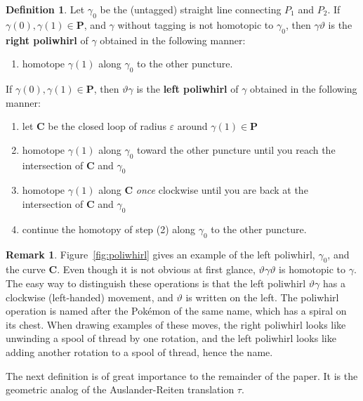 \documentclass[11pt]{amsart}
\theoremstyle{plain}
\theoremstyle{definition}
\newtheorem{definition}[theorem]{Definition}
\newtheorem{remark}[theorem]{Remark}
\numberwithin{equation}{section}
\def\PP{\mathbf{P}}
\begin{document}
\begin{definition}\label{def-poliwhirl}
    Let $\gamma_0$ be the (untagged) straight line connecting $P_1$ and $P_2$.
    If $\gamma(0),\gamma(1) \in \PP$, and $\gamma$ without tagging is not homotopic to $\gamma_0$, then $\gamma\vartheta$ is the \textbf{right poliwhirl} of $\gamma$ obtained in the following manner:
    \begin{enumerate}
        \item homotope $\gamma(1)$ along $\gamma_0$ to the other puncture.
    \end{enumerate}
    If $\gamma(0),\gamma(1) \in \PP$, then $\vartheta\gamma$ is the \textbf{left poliwhirl} of $\gamma$ obtained in the following manner:
    \begin{enumerate}
        \item let $\mathbf{C}$ be the closed loop of radius $\varepsilon$ around $\gamma(1) \in \PP$
        \item homotope $\gamma(1)$ along $\gamma_0$ toward the other puncture until you reach the intersection of $\mathbf{C}$ and $\gamma_0$
        \item homotope $\gamma(1)$ along $\mathbf{C}$ \textit{once} clockwise until you are back at the intersection of $\mathbf{C}$ and $\gamma_0$
        \item continue the homotopy of step (2) along $\gamma_0$ to the other puncture.
    \end{enumerate}
\end{definition}

\begin{remark}
    Figure~\ref{fig:poliwhirl} gives an example of the left poliwhirl, $\gamma_0$, and the curve $\mathbf{C}$.
    Even though it is not obvious at first glance, $\vartheta\gamma\vartheta$ is homotopic to $\gamma$.
    The easy way to distinguish these operations is that the left poliwhirl $\vartheta\gamma$ has a clockwise (left-handed) movement, and $\vartheta$ is written on the left.
    The poliwhirl operation is named after the Pok\'emon of the same name, which has a spiral on its chest.
    When drawing examples of these moves, the right poliwhirl looks like unwinding a spool of thread by one rotation, and the left poliwhirl looks like adding another rotation to a spool of thread, hence the name.
\end{remark}

The next definition is of great importance to the remainder of the paper. 
It is the geometric analog of the Auslander-Reiten translation $\tau$.
\end{document}
